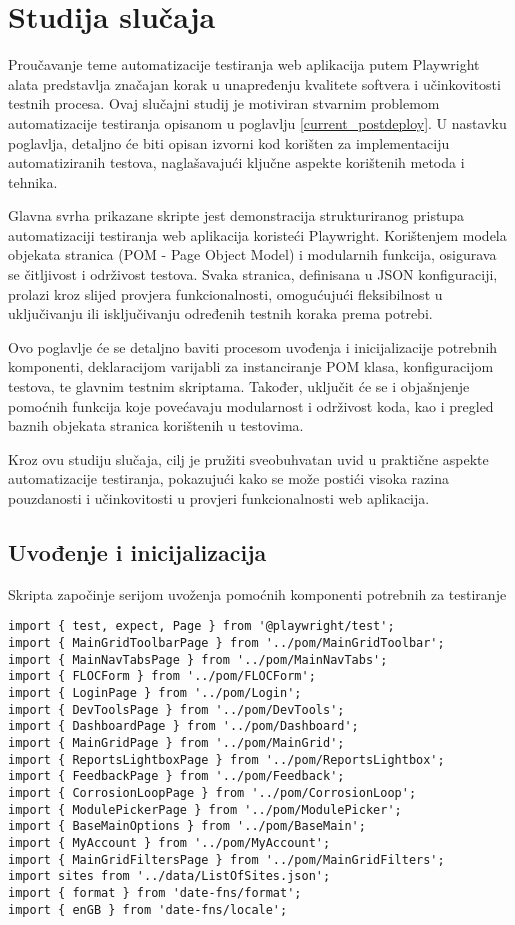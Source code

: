 \chapter{Studija slučaja}\label{ch:implementacija}

Proučavanje teme automatizacije testiranja web aplikacija putem Playwright alata predstavlja značajan korak u unapređenju kvalitete softvera i učinkovitosti testnih procesa.
Ovaj slučajni studij je motiviran stvarnim problemom automatizacije testiranja opisanom u poglavlju \ref{current_postdeploy}.
U nastavku poglavlja, detaljno će biti opisan izvorni kod korišten za implementaciju automatiziranih testova, naglašavajući ključne aspekte korištenih metoda i tehnika.

Glavna svrha prikazane skripte jest demonstracija strukturiranog pristupa automatizaciji testiranja web aplikacija koristeći Playwright.
Korištenjem modela objekata stranica (POM - Page Object Model) i modularnih funkcija, osigurava se čitljivost i održivost testova. 
Svaka stranica, definisana u JSON konfiguraciji, prolazi kroz slijed provjera funkcionalnosti, omogućujući fleksibilnost u uključivanju ili isključivanju određenih testnih koraka prema potrebi.

Ovo poglavlje će se detaljno baviti procesom uvođenja i inicijalizacije potrebnih komponenti, deklaracijom varijabli za instanciranje POM klasa, konfiguracijom testova, te glavnim testnim skriptama. 
Također, uključit će se i objašnjenje pomoćnih funkcija koje povećavaju modularnost i održivost koda, kao i pregled baznih objekata stranica korištenih u testovima.

Kroz ovu studiju slučaja, cilj je pružiti sveobuhvatan uvid u praktične aspekte automatizacije testiranja, pokazujući kako se može postići visoka razina pouzdanosti i učinkovitosti u provjeri funkcionalnosti web aplikacija.


\section{Uvođenje i inicijalizacija}
Skripta započinje serijom uvoženja pomoćnih komponenti potrebnih za testiranje
\begin{verbatim}
import { test, expect, Page } from '@playwright/test';
import { MainGridToolbarPage } from '../pom/MainGridToolbar';
import { MainNavTabsPage } from '../pom/MainNavTabs';
import { FLOCForm } from '../pom/FLOCForm';
import { LoginPage } from '../pom/Login';
import { DevToolsPage } from '../pom/DevTools';
import { DashboardPage } from '../pom/Dashboard';
import { MainGridPage } from '../pom/MainGrid';
import { ReportsLightboxPage } from '../pom/ReportsLightbox';
import { FeedbackPage } from '../pom/Feedback';
import { CorrosionLoopPage } from '../pom/CorrosionLoop';
import { ModulePickerPage } from '../pom/ModulePicker';
import { BaseMainOptions } from '../pom/BaseMain';
import { MyAccount } from '../pom/MyAccount';
import { MainGridFiltersPage } from '../pom/MainGridFilters';
import sites from '../data/ListOfSites.json';
import { format } from 'date-fns/format';
import { enGB } from 'date-fns/locale';
\end{verbatim}


